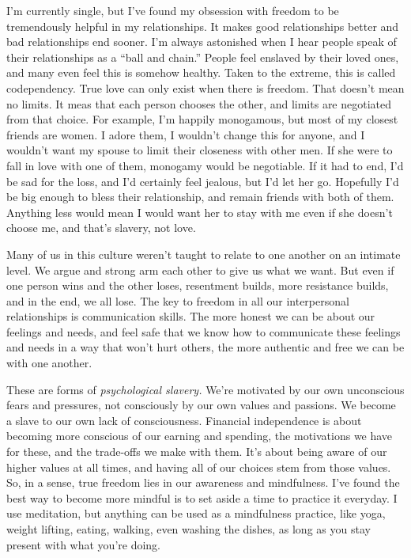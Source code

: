 I'm currently single, but I've found my obsession with freedom to be tremendously helpful in my relationships. It makes good relationships better and bad relationships end sooner. I'm always astonished when I hear people speak of their relationships as a ``ball and chain.'' People feel enslaved by their loved ones, and many even feel this is somehow healthy. Taken to the extreme, this is called codependency. True love can only exist when there is freedom. That doesn't mean no limits. It meas that each person chooses the other, and limits are negotiated from that choice. For example, I'm happily monogamous, but most of my closest friends are women. I adore them, I wouldn't change this for anyone, and I wouldn't want my spouse to limit their closeness with other men. If she were to fall in love with one of them, monogamy would be negotiable. If it had to end, I'd be sad for the loss, and I'd certainly feel jealous, but I'd let her go. Hopefully I'd be big enough to bless their relationship, and remain friends with both of them. Anything less would mean I would want her to stay with me even if she doesn't choose me, and that's slavery, not love.

Many of us in this culture weren't taught to relate to one another on an intimate level. We argue and strong arm each other to give us what we want. But even if one person wins and the other loses, resentment builds, more resistance builds, and in the end, we all lose. The key to freedom in all our interpersonal relationships is communication skills. The more honest we can be about our feelings and needs, and feel safe that we know how to communicate these feelings and needs in a way that won't hurt others, the more authentic and free we can be with one another.

These are forms of \emph{psychological slavery.} We're motivated by our own unconscious fears and pressures, not consciously by our own values and passions. We become a slave to our own lack of consciousness. Financial independence is about becoming more conscious of our earning and spending, the motivations we have for these, and the trade-offs we make with them. It's about being aware of our higher values at all times, and having all of our choices stem from those values. So, in a sense, true freedom lies in our awareness and mindfulness. I've found the best way to become more mindful is to set aside a time to practice it everyday. I use meditation, but anything can be used as a mindfulness practice, like yoga, weight lifting, eating, walking, even washing the dishes, as long as you stay present with what you're doing.

